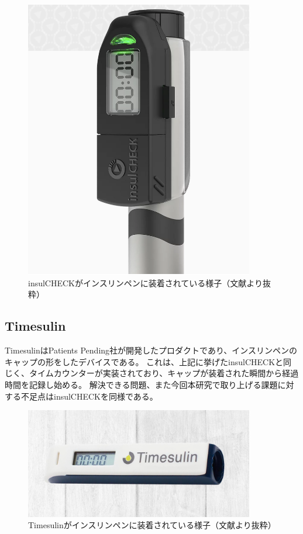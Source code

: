 \begin{figure}[htbp]
  \caption{insulCHECKがインスリンペンに装着されている様子（文献\cite{insulcheck}より抜粋）}
  \label{fig:insulcheck_display}
  \begin{center}
    \includegraphics[bb=0 0 1000 500,width=10cm]{assets/insulcheck_display.png}
  \end{center}
\end{figure}

\subsection{Timesulin}

TimesulinはPatients Pending社が開発したプロダクトであり、インスリンペンのキャップの形をしたデバイスである。
これは、上記に挙げたinsulCHECKと同じく、タイムカウンターが実装されており、キャップが装着された瞬間から経過時間を記録し始める。
解決できる問題、また今回本研究で取り上げる課題に対する不足点はinsulCHECKを同様である。

\begin{figure}[htbp]
  \caption{Timesulinがインスリンペンに装着されている様子（文献\cite{timesulin}より抜粋）}
  \label{fig:timesulin_display}
  \begin{center}
    \includegraphics[bb=0 0 1000 500,width=10cm]{assets/timesulin_display.png}
  \end{center}
\end{figure}


